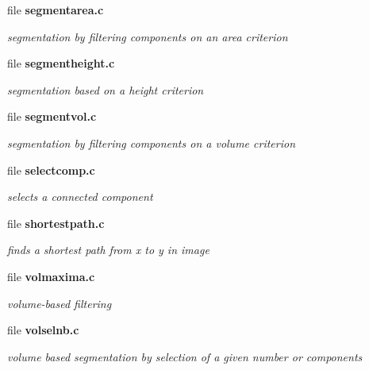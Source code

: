 \begin{CompactItemize}
\item 
file {\bf segmentarea.c}
\begin{CompactList}\small\item\em segmentation by filtering components on an area criterion \item\end{CompactList}

\item 
file {\bf segmentheight.c}
\begin{CompactList}\small\item\em segmentation based on a height criterion \item\end{CompactList}

\item 
file {\bf segmentvol.c}
\begin{CompactList}\small\item\em segmentation by filtering components on a volume criterion \item\end{CompactList}

\item 
file {\bf selectcomp.c}
\begin{CompactList}\small\item\em selects a connected component \item\end{CompactList}

\item 
file {\bf shortestpath.c}
\begin{CompactList}\small\item\em finds a shortest path from x to y in image \item\end{CompactList}

\item 
file {\bf volmaxima.c}
\begin{CompactList}\small\item\em volume-based filtering \item\end{CompactList}

\item 
file {\bf volselnb.c}
\begin{CompactList}\small\item\em volume based segmentation by selection of a given number or components \item\end{CompactList}


\end{CompactItemize}
